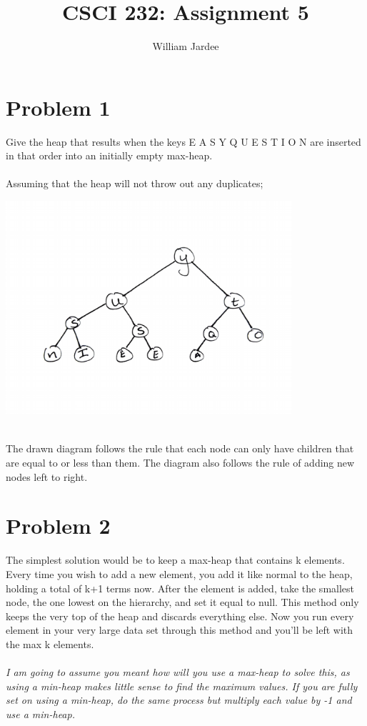 \documentclass[11pt]{article}
\begin{document}
\date{}

\title{CSCI 232: Assignment 5 }

\author{William Jardee}

\maketitle


\section*{Problem 1}
Give the heap that results when the keys E A S Y Q U E S T I O N are inserted in that order into an initially empty max-heap.\\\\

Assuming that the heap will not throw out any duplicates; \\

\parbox{0}{ \includegraphics[width = 300pt]{Homework_2/max_heap(1).pdf}}\\
The drawn diagram follows the rule that each node can only have children that are equal to or less than them. The diagram also follows the rule of adding new nodes left to right.
\newpage

\section*{Problem 2}
The simplest solution would be to keep a max-heap that contains k elements. Every time you wish to add a new element, you add it like normal to the heap, holding a total of k+1 terms now. After the element is added, take the smallest node, the one lowest on the hierarchy, and set it equal to null. This method only keeps the very top of the heap and discards everything else. Now you run every element in your very large data set through this method and you'll be left with the max k elements.\\\\
\textit{I am going to assume you meant how will you use a max-heap to solve this, as using a min-heap makes little sense to find the maximum values. If you are fully set on using a min-heap, do the same process but multiply each value by -1 and use a min-heap.}
\end{document}

